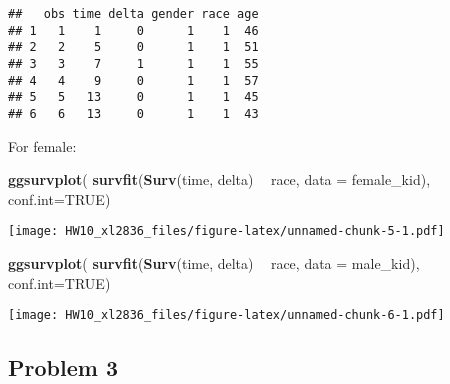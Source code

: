 \documentclass[]{article}
\newenvironment{Shaded}{\begin{snugshade}}{\end{snugshade}}
\newcommand{\KeywordTok}[1]{\textcolor[rgb]{0.13,0.29,0.53}{\textbf{#1}}}
\newcommand{\DataTypeTok}[1]{\textcolor[rgb]{0.13,0.29,0.53}{#1}}
\newcommand{\DecValTok}[1]{\textcolor[rgb]{0.00,0.00,0.81}{#1}}
\newcommand{\StringTok}[1]{\textcolor[rgb]{0.31,0.60,0.02}{#1}}
\newcommand{\OtherTok}[1]{\textcolor[rgb]{0.56,0.35,0.01}{#1}}
\newcommand{\OperatorTok}[1]{\textcolor[rgb]{0.81,0.36,0.00}{\textbf{#1}}}
\newcommand{\NormalTok}[1]{#1}
\begin{document}
\begin{verbatim}
##   obs time delta gender race age
## 1   1    1     0      1    1  46
## 2   2    5     0      1    1  51
## 3   3    7     1      1    1  55
## 4   4    9     0      1    1  57
## 5   5   13     0      1    1  45
## 6   6   13     0      1    1  43
\end{verbatim}

\begin{Shaded}
\end{Shaded}

For female:

\begin{Shaded}
\begin{Highlighting}[]
\KeywordTok{ggsurvplot}\NormalTok{( }\KeywordTok{survfit}\NormalTok{(}\KeywordTok{Surv}\NormalTok{(time, delta) }\OperatorTok{~}\StringTok{ }\NormalTok{race, }\DataTypeTok{data =}\NormalTok{ female_kid), }\DataTypeTok{conf.int=}\OtherTok{TRUE}\NormalTok{)}
\end{Highlighting}
\end{Shaded}

\texttt{[image: HW10\_xl2836\_files/figure-latex/unnamed-chunk-5-1.pdf]}

\begin{Shaded}
\begin{Highlighting}[]
\KeywordTok{ggsurvplot}\NormalTok{( }\KeywordTok{survfit}\NormalTok{(}\KeywordTok{Surv}\NormalTok{(time, delta) }\OperatorTok{~}\StringTok{ }\NormalTok{race, }\DataTypeTok{data =}\NormalTok{ male_kid), }\DataTypeTok{conf.int=}\OtherTok{TRUE}\NormalTok{)}
\end{Highlighting}
\end{Shaded}

\texttt{[image: HW10\_xl2836\_files/figure-latex/unnamed-chunk-6-1.pdf]}

\subsection{Problem 3}\label{problem-3}
\end{document}
